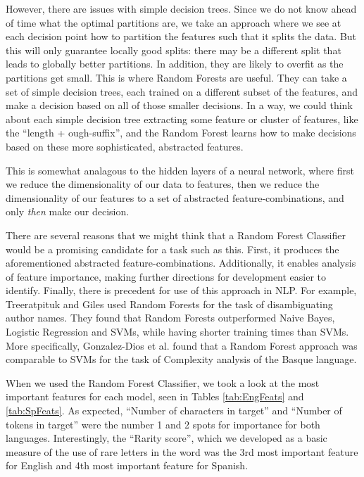 \documentclass[11pt,a4paper]{article}
\begin{document}
However, there are issues with simple decision trees. Since we do not know ahead of time what the optimal partitions are, we take an approach where we see at each decision point how to partition the features such that it splits the data. But this will only guarantee locally good splits: there may be a different split that leads to globally better partitions. In addition, they are likely to overfit as the partitions get small. This is where Random Forests are useful. They can take a set of simple decision trees, each trained on a different subset of the features, and make a decision based on all of those smaller decisions. In a way, we could think about each simple decision tree extracting some feature or cluster of features, like the \enquote{length + ough-suffix}, and the Random Forest learns how to make decisions based on these more sophisticated, abstracted features. 

This is somewhat analagous to the hidden layers of a neural network, where first we reduce the dimensionality of our data to features, then we reduce the dimensionality of our features to a set of abstracted feature-combinations, and only \emph{then} make our decision.

 There are several reasons that we might think that a Random Forest Classifier would be a promising candidate for a task such as this. First, it produces the aforementioned abstracted feature-combinations. Additionally, it enables analysis of feature importance, making further directions for development easier to identify. Finally, there is precedent for use of this approach in NLP. For example, Treeratpituk and Giles \citep{treeratpituk2009disambiguating}
used Random Forests for the task of disambiguating author names. They found that Random Forests outperformed Naive Bayes, Logistic Regression and SVMs, while having shorter training times than SVMs. More specifically, Gonzalez-Dios et al. \cite{gonzalez2014simple} found that a Random Forest approach was comparable to SVMs for the task of Complexity analysis of the Basque language.



When we used the Random Forest Classifier, we took a look at the most important features for each model, seen in Tables \ref{tab:EngFeats} and \ref{tab:SpFeats}. As expected, \enquote{Number of characters in target} and \enquote{Number of tokens in target} were the number 1 and 2 spots for importance for both languages. Interestingly, the \enquote{Rarity score}, which we developed as a basic measure of the use of rare letters in the word was the 3rd most important feature for English and 4th most important feature for Spanish. 
\end{document}
